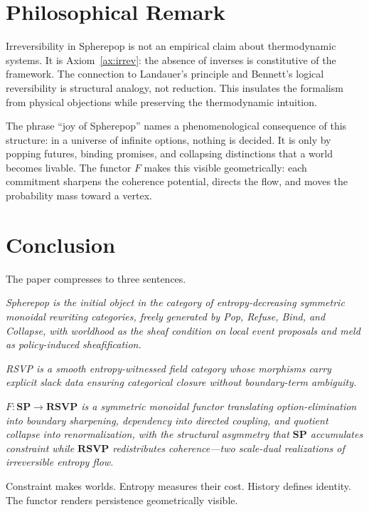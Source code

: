 \documentclass[12pt,a4paper]{article}
\theoremstyle{definition}
\theoremstyle{remark}
\newcommand{\SP}{\mathbf{SP}}
\newcommand{\RSVP}{\mathbf{RSVP}}
\begin{document}
\section{Philosophical Remark}
\label{sec:philosophy}

Irreversibility in Spherepop is not an empirical claim about thermodynamic systems. It
is Axiom~\ref{ax:irrev}: the absence of inverses is constitutive of the framework. The
connection to Landauer's principle and Bennett's logical reversibility is structural
analogy, not reduction. This insulates the formalism from physical objections while
preserving the thermodynamic intuition.

The phrase ``joy of Spherepop'' names a phenomenological consequence of this structure:
in a universe of infinite options, nothing is decided. It is only by popping futures,
binding promises, and collapsing distinctions that a world becomes livable. The
functor $F$ makes this visible geometrically: each commitment sharpens the coherence
potential, directs the flow, and moves the probability mass toward a vertex.

\section{Conclusion}
\label{sec:conclusion}

The paper compresses to three sentences.

\medskip
\noindent
\emph{Spherepop is the initial object in the category of entropy-decreasing symmetric
monoidal rewriting categories, freely generated by Pop, Refuse, Bind, and Collapse,
with worldhood as the sheaf condition on local event proposals and meld as
policy-induced sheafification.}

\medskip
\noindent
\emph{RSVP is a smooth entropy-witnessed field category whose morphisms carry
explicit slack data ensuring categorical closure without boundary-term ambiguity.}

\medskip
\noindent
\emph{$F:\SP\to\RSVP$ is a symmetric monoidal functor translating option-elimination
into boundary sharpening, dependency into directed coupling, and quotient collapse
into renormalization, with the structural asymmetry that $\SP$ accumulates constraint
while $\RSVP$ redistributes coherence---two scale-dual realizations of irreversible
entropy flow.}

\medskip
Constraint makes worlds. Entropy measures their cost. History defines identity.
The functor renders persistence geometrically visible.
\end{document}
